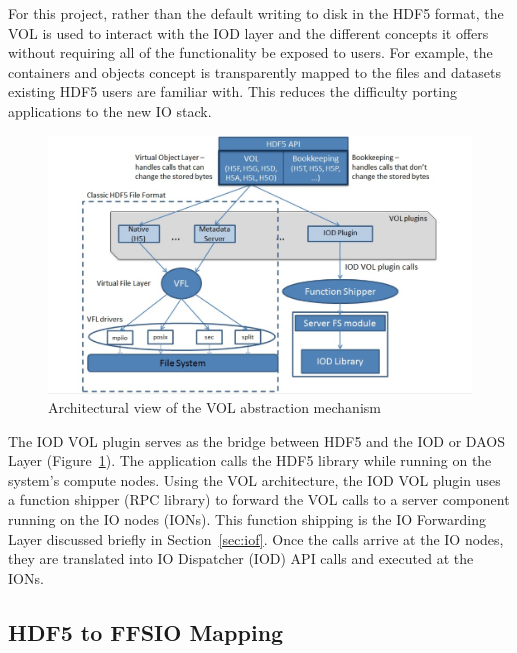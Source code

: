 \documentclass[conference]{IEEEtran}
\begin{document}
For this project, rather than the default writing to disk in the HDF5 format,
the VOL is used to interact with the IOD layer and the different concepts it
offers without requiring all of the functionality be exposed to users. For
example, the containers and objects concept is transparently mapped to the
files and datasets existing HDF5 users are familiar with.  This reduces the
difficulty porting applications to the new IO stack.

\begin{figure}[htbp]
\vspace{-0.10in}
\centering
\includegraphics[width=\columnwidth]{images/vol-arch.png}
\vspace{-0.10in}
\caption{Architectural view of the VOL abstraction mechanism}
\label{fig:vol-arch}
\vspace{-0.10in}
\end{figure}


The IOD VOL plugin serves as the bridge between HDF5 and the IOD or DAOS Layer
(Figure~\ref{fig:vol-arch}). The application calls the HDF5 library while
running on the system's compute nodes. Using the VOL architecture, the IOD VOL
plugin uses a function shipper (RPC library) to forward the VOL calls to a
server component running on the IO nodes (IONs). This function shipping is the
IO Forwarding Layer discussed briefly in Section~\ref{sec:iof}. Once the calls
arrive at the IO nodes, they are translated into IO Dispatcher (IOD) API calls
and executed at the IONs.

\subsection{HDF5 to FFSIO Mapping}
\label{sec:hdf-to-ffsio}
\end{document}
